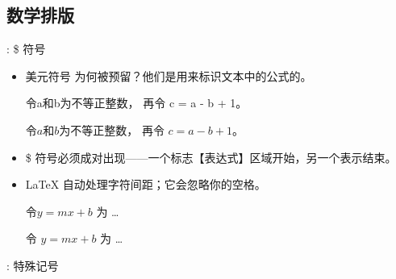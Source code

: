 \documentclass{beamer}
\begin{document}
\subsection{数学排版}
\begin{frame}[fragile]{\insertsubsection{}: \$ 符号}
\begin{itemize}
\item 美元符号 \keystrokebftt{\$}为何被预留？他们是用来标识文本中的公式的。\\[1ex]
\begin{exampletwouptiny}
令a和b为不等正整数，
再令 c = a - b + 1。

令$a$和$b$为不等正整数，
再令 $c = a - b + 1$。
\end{exampletwouptiny}
\item \$ 符号必须成对出现——一个标志【表达式】区域开始，另一个表示结束。
\item \LaTeX{} 自动处理字符间距；它会忽略你的空格。
\begin{exampletwouptiny}
令$y=mx+b$ 为 \ldots

令 $y = m x + b$ 为 \ldots
\end{exampletwouptiny}
\end{itemize}
\end{frame}

\begin{frame}[fragile]{\insertsubsection{}: 特殊记号}
\end{frame}
\end{document}
